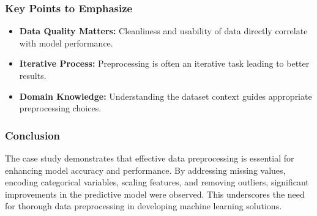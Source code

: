 \documentclass[aspectratio=169]{beamer}
\begin{document}
\begin{frame}[fragile]
    \frametitle{Key Points to Emphasize}
    \begin{itemize}
        \item \textbf{Data Quality Matters:} Cleanliness and usability of data directly correlate with model performance.
        \item \textbf{Iterative Process:} Preprocessing is often an iterative task leading to better results.
        \item \textbf{Domain Knowledge:} Understanding the dataset context guides appropriate preprocessing choices.
    \end{itemize}
\end{frame}

\begin{frame}[fragile]
    \frametitle{Conclusion}
    The case study demonstrates that effective data preprocessing is essential for enhancing model accuracy and performance. By addressing missing values, encoding categorical variables, scaling features, and removing outliers, significant improvements in the predictive model were observed. This underscores the need for thorough data preprocessing in developing machine learning solutions.
\end{frame}
\end{document}
